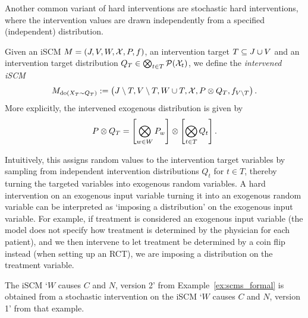 Another common variant of hard interventions are stochastic hard interventions, where the intervention
values are drawn independently from a specified (independent) distribution.
\begin{Def}\label{def:scm_hard_intervention_stochastic}
  Given an iSCM $M = \left ( J, V, W, \mathcal{X}, P, f \right )$, an intervention target $T \subseteq J \cup V$ %
  and an intervention target distribution $Q_T \in \bigotimes_{t\in T} \mathcal{P}(\mathcal{X}_t)$, we define the \emph{intervened iSCM}
  $$M_{\operatorname{do}(X_{T}\sim Q_T)} := \left ( J\setminus T,V\setminus T,W \cup T,\mathcal{X},P \otimes Q_T,f_{V\setminus T} \right ).$$
  More explicitly, the intervened exogenous distribution is given by
  $$P \otimes Q_T = \left[\bigotimes_{w \in W} P_w\right] \otimes \left[\bigotimes_{t \in T} Q_t\right].$$
\end{Def}
Intuitively, this assigns random values to the intervention target variables
by sampling from independent intervention distributions $Q_t$ for $t \in T$, thereby
turning the targeted variables into exogenous random variables.
A hard intervention on an exogenous input variable turning it into an exogenous random variable
can be interpreted as `imposing a distribution' on the exogenous input variable.
For example, if treatment is considered an exogenous input variable (the model does not specify 
how treatment is determined by the physician for each patient), and we then intervene to let 
treatment be determined by a coin flip instead (when setting up an RCT),
we are imposing a distribution on the treatment variable.
\begin{Eg}
  The iSCM `$W$ causes $C$ and $N$, version 2' from Example~\ref{ex:scms_formal} is obtained from 
  a stochastic intervention on the iSCM `$W$ causes $C$ and $N$, version 1' from that example.
\end{Eg}

